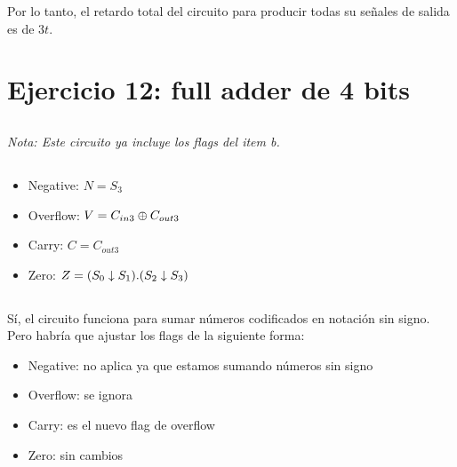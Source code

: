 Por lo tanto, el retardo total del circuito para producir todas su señales de salida es de $3t$.

\pagebreak

\section{Ejercicio 12: full adder de 4 bits}

\subsection{}

\begin{figure}[ht]
    
\end{figure}

\emph{Nota: Este circuito ya incluye los flags del item b.}

\subsection{}

\begin{itemize}
    \item Negative: $N = S_3$
    \item Overflow: $V = C_{in3} \oplus C_{out3}$
    \item Carry: $C = C_{out3}$
    \item Zero: $Z = (S_0 \downarrow S_1) . (S_2 \downarrow S_3)$
\end{itemize}

\subsection{}

Sí, el circuito funciona para sumar números codificados en notación sin signo. Pero habría que ajustar los flags de la siguiente forma:

\begin{itemize}
    \item Negative: no aplica ya que estamos sumando números sin signo
    \item Overflow: se ignora
    \item Carry: es el nuevo flag de overflow
    \item Zero: sin cambios
\end{itemize}


